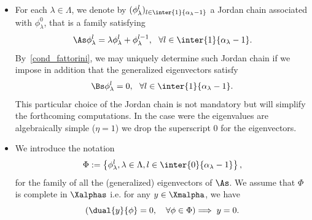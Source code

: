 \begin{itemize}
As we are interested in null-controllability properties of system~\eqref{systeme}, we will first assume that
\begin{equation}\label{cond_fattorini}
\Bs \phi_\lambda^0 \neq 0, \ \ \text{for any } \lambda\in \Lambda.
\end{equation}
This is a necessary condition for the approximate controllability of system~\eqref{systeme}, and is therefore mandatory if we expect null-controllability to hold. In our setting, the assumption~\eqref{cond_fattorini} is also a sufficient condition for approximate controllability (see~\cite{Fattorini66, Olive13}).

When the considered set of initial data $\Fzp$ is not the whole space $\Xmalpha$, the approximate controllability condition~\eqref{cond_fattorini} can be too strong and we can relax it. We will discuss this point in Section~\ref{Sec:Gestion_de_B*}.


\item For each $\lambda\in \Lambda$, we denote by $(\phi_\lambda^l)_{l \in \inter{1}{\alpha_\lambda-1}}$ a Jordan chain associated with $\phi_\lambda^0$, that is a family satisfying
\begin{equation*}\label{def_chaine_Jordan}
\As \phi_\lambda^l = \lambda \phi_\lambda^l + \phi_\lambda^{l-1}, \ \ \forall l\in \inter{1}{\alpha_{\lambda}-1}.
\end{equation*}
By~\eqref{cond_fattorini}, we may uniquely determine such Jordan chain if we impose in addition that the generalized eigenvectors satisfy
\begin{equation}\label{normalisation_chaine_Jordan}
\Bs \phi_\lambda^l = 0, \ \ \forall l \in \inter{1}{\alpha_{\lambda}-1}.
\end{equation}
This particular choice of the Jordan chain is not mandatory but will simplify the forthcoming computations. In the case were the eigenvalues are algebraically simple ($\eta =1$) we drop the superscript $0$ for the eigenvectors.
\item We introduce the notation
\[
\Phi:=\left\{\phi_\lambda^l, \lambda\in \Lambda, l\in \inter{0}{\alpha_\lambda-1} \right\},
\]
for the family of all the (generalized) eigenvectors of $\As$. We assume that $\Phi$ is complete in $\Xalphas$ i.e. for any $y \in \Xmalpha$, we have
\begin{equation}\label{FamilleComplete}
\left(\dual{y}{\phi} =0, \quad \forall \phi\in \Phi \right) \Longrightarrow \; y=0.
\end{equation}
\end{itemize}


